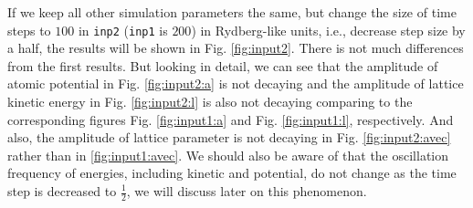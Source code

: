 If we keep all other simulation parameters the same, but change
the size of time steps to $100$ in \texttt{inp2} (\texttt{inp1} is $200$) in Rydberg-like units,
i.e., decrease step size by a half, the results will be shown in Fig. \ref{fig:input2}.
There is not much differences from the first results. But looking in detail,
we can see that the amplitude of atomic potential in Fig. \ref{fig:input2:a} is not decaying
and the amplitude of lattice kinetic energy in Fig. \ref{fig:input2:l} is also not decaying
comparing to the corresponding figures Fig. \ref{fig:input1:a} and Fig. \ref{fig:input1:l},
respectively. And also, the amplitude of lattice parameter is not decaying in
Fig. \ref{fig:input2:avec} rather than in \ref{fig:input1:avec}. We should also be aware of
that the oscillation frequency of energies, including kinetic and potential, do not change
as the time step is decreased to $\frac{ 1 }{ 2 }$, we will discuss later on this phenomenon.

